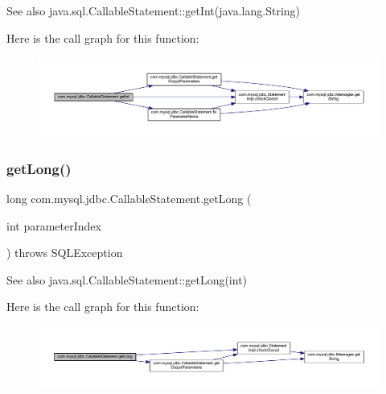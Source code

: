 \begin{DoxySeeAlso}{See also}
java.\+sql.\+Callable\+Statement\+::get\+Int(java.\+lang.\+String) 
\end{DoxySeeAlso}
Here is the call graph for this function\+:\nopagebreak
\begin{figure}[H]
\begin{center}
\leavevmode
\includegraphics[width=350pt]{classcom_1_1mysql_1_1jdbc_1_1_callable_statement_a73f5f0d0b8156cf0ad5f9cf4840761d7_cgraph}
\end{center}
\end{figure}
\mbox{\label{classcom_1_1mysql_1_1jdbc_1_1_callable_statement_a7e0a085c7abe35479c63872335ac6f8f}} 
\subsubsection{\texorpdfstring{get\+Long()}{getLong()}\hspace{0.1cm}{\footnotesize\ttfamily [1/2]}}
{\footnotesize\ttfamily long com.\+mysql.\+jdbc.\+Callable\+Statement.\+get\+Long (\begin{DoxyParamCaption}\item[{int}]{parameter\+Index }\end{DoxyParamCaption}) throws S\+Q\+L\+Exception}

\begin{DoxySeeAlso}{See also}
java.\+sql.\+Callable\+Statement\+::get\+Long(int) 
\end{DoxySeeAlso}
Here is the call graph for this function\+:\nopagebreak
\begin{figure}[H]
\begin{center}
\leavevmode
\includegraphics[width=350pt]{classcom_1_1mysql_1_1jdbc_1_1_callable_statement_a7e0a085c7abe35479c63872335ac6f8f_cgraph}
\end{center}
\end{figure}
\mbox{\label{classcom_1_1mysql_1_1jdbc_1_1_callable_statement_a71fe668a8e85c9a07c6f66d80edbff88}} 
